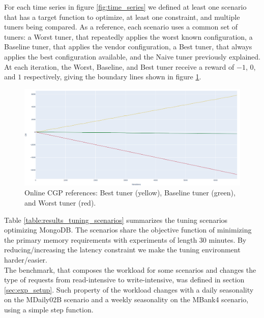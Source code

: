 \documentclass[a4paper, 12pt]{article} %
\begin{document}
	For each time series in figure \ref{fig:time_series} we defined at least one scenario that has a target function to optimize, at least one constraint, and multiple tuners being compared. As a reference, each scenario uses a common set of tuners: a Worst tuner, that repeatedly applies the worst known configuration, a Baseline tuner, that applies the vendor configuration, a Best tuner, that always applies the best configuration available, and the Naive tuner previously explained.\\
	At each iteration, the Worst, Baseline, and Best tuner receive a reward of $-1$, $0$, and $1$ respectively, giving the boundary lines shown in figure \ref{fig:results_onlinecgp_references}.
	
	\begin{figure} \centering
		\includegraphics[width=4.5in]{img/results_onlinecgp_references.png}
		\caption{Online CGP references: Best tuner (yellow), Baseline tuner (green), and Worst tuner (red).}
		\label{fig:results_onlinecgp_references}
	\end{figure}
	
	
	Table \ref{table:results_tuning_scenarios} summarizes the tuning scenarios optimizing MongoDB. The scenarios share the objective function of minimizing the primary memory requirements with experiments of length 30 minutes. By reducing/increasing the latency constraint we make the tuning environment harder/easier. \\
	The benchmark, that composes the workload for some scenarios and changes the type of requests from read-intensive to write-intensive, was defined in section \ref{sec:exp_setup}.
	Such property of the workload changes with a daily seasonality on the MDaily02B scenario and a weekly seasonality on the MBank4 scenario, using a simple step function. 
\end{document}
